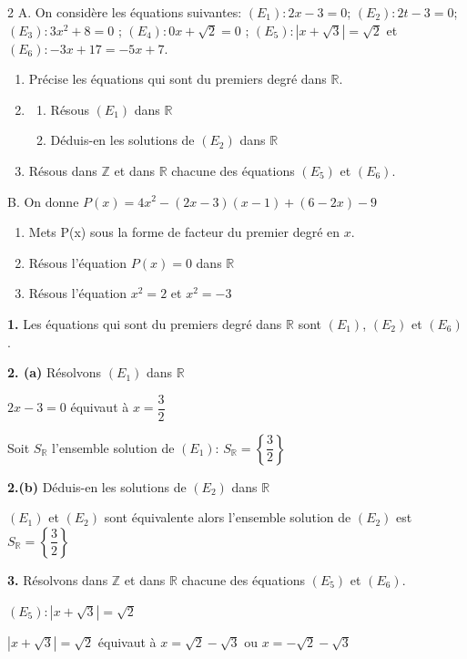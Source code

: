 \begin{multicols*}{2}
  	A.	On considère les équations suivantes: $(E_{1}): 2x-3=0 $; $(E_{2}): 2t-3=0 $; 
  	$(E_{3}): 3x^2+8=0 $ ; $(E_{4}): 0x+\sqrt{2}=0 $ ; $(E_{5}):\left|x+\sqrt{3} \right |=\sqrt{2} $ et $(E_{6}): -3x+17= -5x+7 $.
  	\begin{enumerate}
  		\item Précise les équations qui sont du premiers degré dans $\mathbb{R}$.
  		\item 
  		\begin{enumerate}
  			\item Résous $(E_{1})$ dans $\mathbb{R}$
  			\item Déduis-en les solutions de $(E_{2})$ dans  $\mathbb{R}$	
  		\end{enumerate} 
  		\item Résous dans $\mathbb{Z}$ et dans  $\mathbb{R}$ chacune des équations $(E_{5})$ et $(E_{6})$.
  	\end{enumerate}
  	B. On donne $ P(x)= 4x^2 - (2x-3)(x-1) + (6-2x) -9 $
  	\begin{enumerate}
  		\item Mets P(x) sous la forme de facteur du premier degré en $ x $.
  		\item Résous l'équation $ P(x)=0 $ dans  $ \mathbb{R} $
  		\item Résous l'équation $ x^2=2 $ et $ x^2=-3 $
  	\end{enumerate}
  	\dure
  	\resul
  	\textbf{1.} Les équations qui sont du premiers degré dans $\mathbb{R}$ sont $(E_{1})$,  $(E_{2})$ et $(E_{6})$.
  	
  	\textbf{2. (a)} Résolvons $(E_{1})$ dans $\mathbb{R}$
  	
  	$2x-3=0 $ équivaut à  $x=\dfrac{3}{2} $
  	
  	Soit $S_{\mathbb{R}}$ l'ensemble solution de $(E_{1})$: $S_{\mathbb{R}}=\left\{\dfrac{3}{2}\right\}$
  	
  	\textbf{2.(b)} Déduis-en les solutions de $(E_{2})$ dans  $\mathbb{R}$
  	
  	$(E_{1})$ et  $(E_{2})$ sont équivalente alors l'ensemble solution de $(E_{2})$ est  $S_{\mathbb{R}}=\left\{\dfrac{3}{2}\right\}$ 
  	
  	\textbf{3.} Résolvons dans $\mathbb{Z}$ et dans  $\mathbb{R}$ chacune des équations $(E_{5})$ et $(E_{6})$.
  	
  	 $(E_{5}):\left|x+\sqrt{3} \right |=\sqrt{2} $ 
  	
  	$\left|x+\sqrt{3} \right |=\sqrt{2}$ équivaut à $x=\sqrt{2}-\sqrt{3}$ ou $x=-\sqrt{2}-\sqrt{3}$
  	

\end{multicols*}
